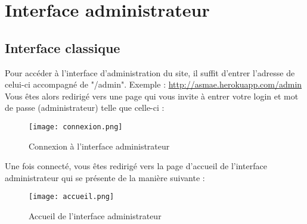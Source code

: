 \chapter{Interface administrateur}

\section{Interface classique}

Pour accéder à l’interface d’administration du site, il suffit d’entrer l’adresse de celui-ci accompagné de "/admin". Exemple : \url{http://asmae.herokuapp.com/admin}\\
Vous êtes alors redirigé vers une page qui vous invite à entrer votre login et mot de passe (administrateur) telle que celle-ci :

\begin{figure}[H]
\centering
\texttt{[image: connexion.png]}
\caption{Connexion à l'interface administrateur}
\end{figure}

Une fois connecté, vous êtes redirigé vers la page d'accueil de l'interface administrateur qui se présente de la manière suivante :

\begin{figure}[H]
\centering
\texttt{[image: accueil.png]}
\caption{Accueil de l'interface administrateur}
\end{figure}

